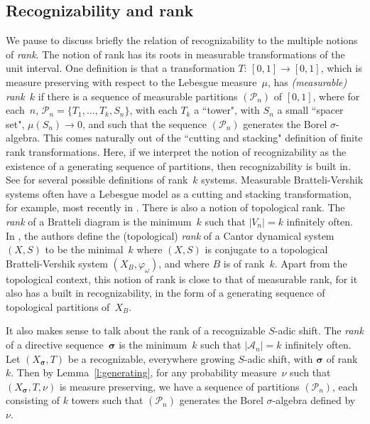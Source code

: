 \documentclass{amsart}
\theoremstyle{definition}
\theoremstyle{remark}
\numberwithin{equation}{section}
\begin{document}
\subsection{Recognizability and rank}

We  pause to discuss briefly the relation of recognizability to the multiple notions of \emph{rank}. 
The notion of rank has its roots in measurable transformations of the unit interval. 
One definition is that a transformation $T:\, [0,1]\rightarrow [0,1]$, which is measure preserving with respect to the Lebesgue measure~$\mu$, has \emph{(measurable) rank~$k$} if there is a sequence of measurable partitions $(\mathcal{P}_n)$ of $[0,1]$, where for each~$n$, $\mathcal{P}_n = \{T_1, \ldots ,T_k, S_n\}$,  with each $T_k$ a ``tower", with $S_n$ a  small ``spacer set", $\mu(S_n) \to 0$, and such that the sequence $(\mathcal{P}_n)$ generates the Borel $\sigma$-algebra. 
This comes naturally out of the ``cutting and stacking" definition of finite rank transformations. Here, if we interpret the notion of recognizability as the existence of a generating sequence of partitions, then recognizability is built in.
See \cite{Ferenczi:96,Fer97} for several possible definitions of rank~$k$ systems. 
Measurable Bratteli-Vershik systems often have a Lebesgue model as a cutting and stacking transformation, for example, most recently in \cite{AFP:2016}.
There is also a notion of topological rank. 
The \emph{rank} of a Bratteli diagram is the minimum~$k$ such that $|V_n|=k$ infinitely often. 
In \cite{Down:2008}, the authors define the (topological) \emph{rank} of a Cantor dynamical system $(X,S)$ to be the minimal~$k$ where $(X,S)$ is conjugate to a topological Bratteli-Vershik system $(X_B,\varphi_\omega)$, and where $B$ is of rank~$k$. Apart from the topological context, this notion of rank is close to that of measurable rank, for it also has a built in recognizability, in the form of a generating sequence of topological partitions of~$X_B$.

It also makes sense to talk about the rank of a recognizable $S$-adic shift. 
The \emph{rank} of a directive sequence~$\boldsymbol{\sigma}$ is the minimum~$k$ such that $|\mathcal A_n|=k$ infinitely often. Let  
$(X_{\boldsymbol{\sigma}}, T)$ be a recognizable, everywhere growing $S$-adic shift, with
$\boldsymbol{\sigma}$ of  rank $k$.
Then by Lemma~\ref{l:generating}, for any probability measure~$\nu$ such that $(X_{\boldsymbol{\sigma}}, T,\nu)$ is measure preserving, we have a sequence of partitions $(\mathcal{P}_n)$, each consisting of $k$ towers such that $(\mathcal{P}_n)$ generates the Borel $\sigma$-algebra defined by~$\nu$.   
\end{document}
